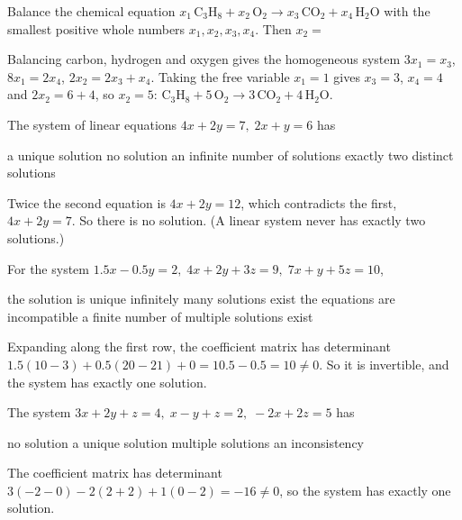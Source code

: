 \begin{question}[id=sys-20, marks=2]
Balance the chemical equation $x_1\,\mathrm{C_3H_8} + x_2\,\mathrm{O_2} \to x_3\,\mathrm{CO_2} + x_4\,\mathrm{H_2O}$ with the smallest positive whole numbers $x_1, x_2, x_3, x_4$. Then $x_2 =$
\begin{solution}
Balancing carbon, hydrogen and oxygen gives the homogeneous system $3x_1 = x_3$, $8x_1 = 2x_4$, $2x_2 = 2x_3 + x_4$. Taking the free variable $x_1 = 1$ gives $x_3 = 3$, $x_4 = 4$ and $2x_2 = 6 + 4$, so $x_2 = 5$: $\mathrm{C_3H_8} + 5\,\mathrm{O_2} \to 3\,\mathrm{CO_2} + 4\,\mathrm{H_2O}$.
\end{solution}
\end{question}


\begin{question}[id=gate-ec2008-1, source=GATE EC 2008]
The system of linear equations $4x + 2y = 7,\; 2x + y = 6$ has
\begin{options}
  \option a unique solution
  \correct no solution
  \option an infinite number of solutions
  \option exactly two distinct solutions
\end{options}
\begin{solution}
Twice the second equation is $4x + 2y = 12$, which contradicts the first, $4x + 2y = 7$. So there is no solution. (A linear system never has exactly two solutions.)
\end{solution}
\end{question}

\begin{question}[id=gate-me1997-1, source=GATE ME 1997, marks=2]
For the system $1.5x - 0.5y = 2,\; 4x + 2y + 3z = 9,\; 7x + y + 5z = 10$,
\begin{options}
  \correct the solution is unique
  \option infinitely many solutions exist
  \option the equations are incompatible
  \option a finite number of multiple solutions exist
\end{options}
\begin{solution}
Expanding along the first row, the coefficient matrix has determinant $1.5(10 - 3) + 0.5(20 - 21) + 0 = 10.5 - 0.5 = 10 \ne 0$. So it is invertible, and the system has exactly one solution.
\end{solution}
\end{question}

\begin{question}[id=gate-me2002-1, source=GATE ME 2002]
The system $3x + 2y + z = 4,\; x - y + z = 2,\; -2x + 2z = 5$ has
\begin{options}
  \option no solution
  \correct a unique solution
  \option multiple solutions
  \option an inconsistency
\end{options}
\begin{solution}
The coefficient matrix has determinant $3(-2 - 0) - 2(2 + 2) + 1(0 - 2) = -16 \ne 0$, so the system has exactly one solution.
\end{solution}
\end{question}

